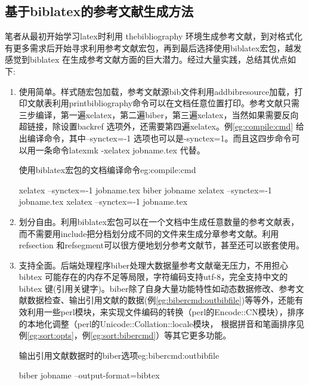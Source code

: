 \subsection{基于biblatex的参考文献生成方法}
笔者从最初开始学习latex时利用 thebibliography 环境生成参考文献，到对格式化有更多需求后开始寻求利用参考文献宏包，再到最后选择使用biblatex宏包，越发感觉到biblatex 在生成参考文献方面的巨大潜力。经过大量实践，总结其优点如下:
\begin{enumerate}
\item 使用简单。样式随宏包加载，参考文献源bib文件利用addbibresource加载，打印文献表利用printbibliography命令可以在文档任意位置打印。参考文献只需三步编译，第一遍xelatex，第二遍biber，第三遍xelatex，当然如果需要反向超链接，除设置backref 选项外，还需要第四遍xelatex。例\ref{eg:compile:cmd} 给出编译命令，其中--synctex=-1 选项也可以是-synctex=1。而且这四步命令可以用一条命令latexmk -xelatex jobname.tex 代替。

    \begin{example}{使用biblatex宏包的文档编译命令}{eg:compile:cmd}
    \begin{texlist}
    xelatex --synctex=-1 jobname.tex
    biber jobname
    xelatex --synctex=-1 jobname.tex
    xelatex --synctex=-1 jobname.tex
    \end{texlist}
    \end{example}

\item 划分自由。利用biblatex宏包可以在一个文档中生成任意数量的参考文献表，而不需要用include把分档划分成不同的文件来生成分章参考文献。利用refsection 和refsegment可以很方便地划分参考文献节，甚至还可以嵌套使用。

\item 支持全面。后端处理程序biber处理大数据量参考文献毫无压力，不用担心bibtex 可能存在的内存不足等局限，字符编码支持utf-8，完全支持中文的bibtex 键(引用关键字)。biber除了自身大量功能特性如动态数据修改、参考文献数据检查、输出引用文献的数据(例\ref{eg:bibercmd:outbibfile})等等外，还能有效利用一些perl模块，来实现文件编码的转换（perl的Encode::CN模块），排序的本地化调整（perl的Unicode::Collation::locale模块，
    根据拼音和笔画排序见例\ref{eg:sort:opts}，例\ref{eg:sort:bibercmd}）等其它更多功能。

    \begin{example}{输出引用文献数据时的biber选项}{eg:bibercmd:outbibfile}
    \begin{texlist}
    biber jobname --output-format=bibtex
    \end{texlist}
    \end{example}


\end{enumerate}
